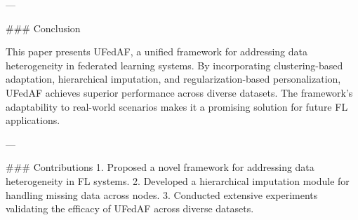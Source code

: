 ---

### Conclusion  

This paper presents UFedAF, a unified framework for addressing data heterogeneity in federated learning systems. By incorporating clustering-based adaptation, hierarchical imputation, and regularization-based personalization, UFedAF achieves superior performance across diverse datasets. The framework's adaptability to real-world scenarios makes it a promising solution for future FL applications.  

---

### Contributions  
1. Proposed a novel framework for addressing data heterogeneity in FL systems.  
2. Developed a hierarchical imputation module for handling missing data across nodes.  
3. Conducted extensive experiments validating the efficacy of UFedAF across diverse datasets.  